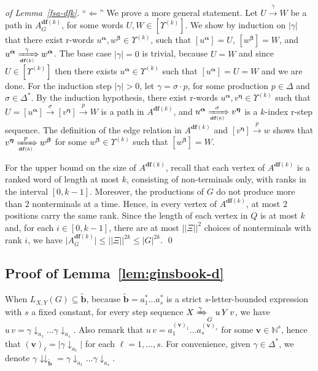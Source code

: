 \documentclass[final]{llncs}
\def\age#1{\left[#1\right]}
\def\nats{{\mathbb{N}}}
\def\card#1{{|\!|{#1}|\!|}}
\def\len#1{{\vert{#1}\vert}}
\def\prod{\Delta}
\def\patt{{\widetilde{\mathbf{b}}}}
\def\df#1{\scriptscriptstyle\mathbf{df}(#1)}
\def\Vars{\ensuremath{\Xi}}
\def\bdwords{\Upsilon}
\def\proj{\mathbin{\downarrow}}
\renewcommand{\proj}[2]{{#1}\mathclose{\downarrow}_{{#2}}}
\newcommand{\projpatt}[1]{{#1}\mathclose{\downdownarrows}_{{\patt}}}
\begin{document}
\begin{proof}[of Lemma~\ref{fsa-dfk}]
  \noindent ``$\Leftarrow$'' We prove a more general statement. Let
  $U \xrightarrow{\gamma} W$ be a path in $A^{\df{k}}_G$, for some
  words \(U,W\in\age{\bdwords^{(k)}}\). We show by induction on
  $\len{\gamma}$ that there exist r-words $u^{\boldsymbol{\alpha}},
  w^{\boldsymbol{\beta}} \in \bdwords^{(k)}$, such
  that \(\age{u^{\boldsymbol{\alpha}}} =
  U\), \(\age{w^{\boldsymbol{\beta}}} = W\),
  and \(u^{\boldsymbol{\alpha}} \xRightarrow[\df{k}]{\gamma}
  w^{\boldsymbol{\alpha}}\). The base case $\len{\gamma}=0$ is
  trivial, because \(U=W\) and since \(U\in\age{\bdwords^{(k)}}\) then
  there exists \(u^{\boldsymbol{\alpha}}\in \bdwords^{(k)}\) such
  that \(\age{u^{\boldsymbol{\alpha}}}=U=W\) and we are done.  For the
  induction step $\len{\gamma} > 0$, let \(\gamma = \sigma \cdot p\),
  for some production \(p \in \prod\) and \(\sigma \in \prod^*\). By
  the induction hypothesis, there exist r-words
  $u^{\boldsymbol{\alpha}}, v^{\boldsymbol{\eta}} \in \bdwords^{(k)}$
  such
  that \(U=\age{u^{\boldsymbol{\alpha}}} \xrightarrow{\sigma} \age{v^{\boldsymbol{\eta}}} \xrightarrow{p}
  W\) is a path in \(A^{\df{k}}\),
  and \(u^{\boldsymbol{\alpha}} \xRightarrow[\df{k}]{\sigma}
  v^{\boldsymbol{\eta}}\) is a \(k\)-index r-step sequence. The
  definition of the edge relation in $A^{\df{k}}$
  and \(\age{v^{\boldsymbol{\eta}}} \xrightarrow{p} w\) shows
  that \(v^{\boldsymbol{\eta}} \xRightarrow[\df{k}]{p}
  w^{\boldsymbol{\beta}}\) for
  some \(w^{\boldsymbol{\beta}}\in\bdwords^{(k)}\) such
  that \(\age{w^{\boldsymbol{\beta}}} = W\). 

For the upper bound on the size of \(A^{\df{k}}\), recall that each vertex of
$A^{\df{k}}$ is a ranked word of length at most $k$, consisting of
non-terminals only, with ranks in the interval \([0,k-1]\). Moreover, the
productions of \(G\) do not produce more than \(2\) nonterminals at a time.
Hence, in every vertex of \(A^{\df{k}}\), at most \(2\) positions carry the
same rank.  Since the length of each vertex in \(Q\) is at most \(k\) and, for
each \(i\in[0,k-1]\), there are at most \(\card{\Vars}^2\) choices of
nonterminals with rank \(i\), we have $\len{A^{\df{k}}_G} \leq
\card{\Vars}^{2k} \leq \len{G}^{2k}$.  \qed
\end{proof}

\subsection{Proof of Lemma~\ref{lem:ginsbook-d}}

When $L_{X,Y}(G) \subseteq \patt$, because \(\patt=a_{1}^* \ldots
a_{s}^*\) is a strict \(s\)-letter-bounded expression with \(s\) a
fixed constant, for every step sequence $X \xRightarrow{\gamma}_G u \,
Y \, v$, we have \(u\, v
= \proj{\gamma}{a_{1}} \ldots \proj{\gamma}{a_{s}}\). Also remark
that \(u\, v = a_1^{(\boldsymbol{v})_1} \ldots a_s^{(\boldsymbol{v})_s}\) for some \(
\boldsymbol{v}\in\nats^s\), hence that \( (\boldsymbol{v})_{\ell}
= \len{\proj{\gamma}{a_\ell}}\) for each \(\ell=1,\ldots,s\).  
For convenience, given \(\gamma\in\prod^{*}\), we
denote \(\projpatt{\gamma}
= \proj{\gamma}{a_1} \ldots \proj{\gamma}{a_s}\).
\end{document}

